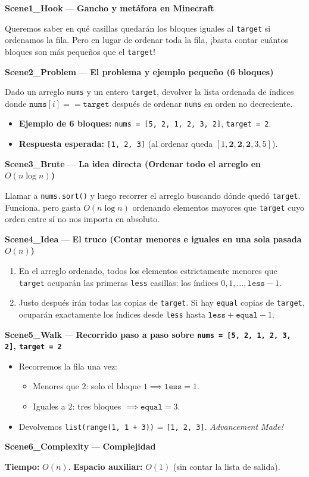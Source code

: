 \documentclass[letterpaper,10pt]{article}
\newcommand{\scene}[2]{\noindent\textbf{\textcolor{mcaqua}{#1}} --- \textbf{#2}\par\vspace{1pt}}
\begin{document}
\begin{shaded}
\scene{Scene1\_Hook}{Gancho y met\'afora en Minecraft}
Queremos saber en qu\'e casillas quedar\'an los bloques iguales al \texttt{target} si ordenamos la fila. Pero en lugar de ordenar toda la fila, ¡basta contar cu\'antos bloques son m\'as peque\~nos que el \texttt{target}!

\scene{Scene2\_Problem}{El problema y ejemplo peque\~no (6 bloques)}
Dado un arreglo \texttt{nums} y un entero \texttt{target}, devolver la lista ordenada de \'indices donde $\texttt{nums}[i] == \texttt{target}$ despu\'es de ordenar \texttt{nums} en orden no decreciente.
\begin{itemize}\setlength{\itemsep}{1pt}
  \item \textbf{Ejemplo de 6 bloques:} \texttt{nums = [5, 2, 1, 2, 3, 2]}, \texttt{target = 2}.
  \item \textbf{Respuesta esperada:} \texttt{[1, 2, 3]} (al ordenar queda $[1, \mathbf{2}, \mathbf{2}, \mathbf{2}, 3, 5]$).
\end{itemize}

\scene{Scene3\_Brute}{La idea directa (Ordenar todo el arreglo en $O(n \log n)$)}
Llamar a \texttt{nums.sort()} y luego recorrer el arreglo buscando dónde quedó \texttt{target}. Funciona, pero gasta $O(n \log n)$ ordenando elementos mayores que \texttt{target} cuyo orden entre sí no nos importa en absoluto.

\scene{Scene4\_Idea}{El truco (Contar menores e iguales en una sola pasada $O(n)$)}
\begin{enumerate}\setlength{\itemsep}{1pt}
  \item En el arreglo ordenado, todos los elementos estrictamente menores que \texttt{target} ocupar\'an las primeras \texttt{less} casillas: los \'indices $0, 1, \dots, \texttt{less} - 1$.
  \item Justo despu\'es ir\'an todas las copias de \texttt{target}. Si hay \texttt{equal} copias de \texttt{target}, ocupar\'an exactamente los \'indices desde \texttt{less} hasta $\texttt{less} + \texttt{equal} - 1$.
\end{enumerate}

\scene{Scene5\_Walk}{Recorrido paso a paso sobre \texttt{nums = [5, 2, 1, 2, 3, 2]}, \texttt{target = 2}}
\begin{itemize}\setlength{\itemsep}{1pt}
  \item Recorremos la fila una vez:
  \begin{itemize}\setlength{\itemsep}{1pt}
    \item Menores que $2$: solo el bloque $1 \implies \texttt{less} = 1$.
    \item Iguales a $2$: tres bloques $\implies \texttt{equal} = 3$.
  \end{itemize}
  \item Devolvemos \texttt{list(range(1, 1 + 3))} = \texttt{[1, 2, 3]}. \textit{Advancement Made!}
\end{itemize}

\scene{Scene6\_Complexity}{Complejidad}
\textbf{Tiempo:} $O(n)$. \quad \textbf{Espacio auxiliar:} $O(1)$ (sin contar la lista de salida).
\end{shaded}
\end{document}
